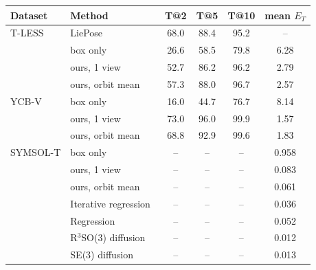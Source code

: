 \begin{tabular}{@{}ll cccc@{}}
\toprule
Dataset & Method & T@2 & T@5 & T@10 & mean $E_T$ \\
\midrule
T-LESS & LiePose~\cite{hsiao2024liepose} & 68.0 & 88.4 & 95.2 & -- \\
 & box only & 26.6 & 58.5 & 79.8 & 6.28 \\
 & ours, 1 view & 52.7 & 86.2 & 96.2 & 2.79 \\
 & ours, orbit mean & 57.3 & 88.0 & 96.7 & 2.57 \\
\midrule
YCB-V & box only & 16.0 & 44.7 & 76.7 & 8.14 \\
 & ours, 1 view & 73.0 & 96.0 & 99.9 & 1.57 \\
 & ours, orbit mean & 68.8 & 92.9 & 99.6 & 1.83 \\
\midrule
SYMSOL-T & box only & -- & -- & -- & 0.958 \\
 & ours, 1 view & -- & -- & -- & 0.083 \\
 & ours, orbit mean & -- & -- & -- & 0.061 \\
 & Iterative regression~\cite{hsiao2024liepose} & -- & -- & -- & 0.036 \\
 & Regression~\cite{hsiao2024liepose} & -- & -- & -- & 0.052 \\
 & R$^3$SO(3) diffusion~\cite{hsiao2024liepose} & -- & -- & -- & 0.012 \\
 & SE(3) diffusion~\cite{hsiao2024liepose} & -- & -- & -- & 0.013 \\
\bottomrule
\end{tabular}